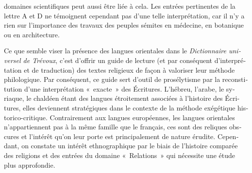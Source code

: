 \documentclass[output=paper,colorlinks,citecolor=brown,arabicfont,chinesefont,booklanguage=french]{langscibook}
\begin{document}
\begin{otherlanguage}{french}
domaines scientifiques peut aussi être liée à cela. Les entrées pertinentes de la lettre A et D ne témoignent cependant pas d'une telle interprétation, car il n'y a rien sur l'importance des travaux des peuples sémites en médecine, en botanique ou en architecture.

Ce que semble viser la présence des langues orientales dans le \emph{Dictionnaire universel de Trévoux}, c'est d’offrir un guide de lecture (et par conséquent d’interprétation et de traduction) des textes religieux de façon à valoriser leur méthode philologique. Par conséquent, ce guide sert d’outil de prosélytisme par la reconstitution d’une interprétation «~exacte~» des Écritures. L’hébreu, l’arabe, le syriaque, le chaldéen étant des langues étroitement associées à l’histoire des Écritures, elles deviennent stratégiques dans le contexte de la méthode exégétique historico-critique. Contrairement aux langues européennes, les langues orientales n’appartiennent pas à la même famille que le français, ces sont des reliques obscures et l’intérêt qu’on leur porte est principalement de nature érudite. Cependant, on constate un intérêt ethnographique par le biais de l’histoire comparée des religions et des entrées du domaine «~Relations~» qui nécessite une étude plus approfondie.




\end{otherlanguage}
\end{document}
